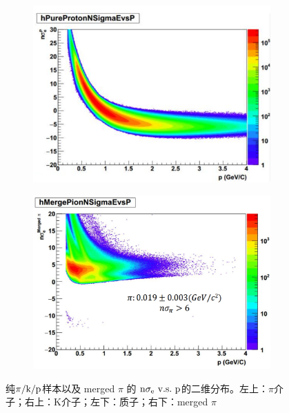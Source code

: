 \begin{figure}[h!]
    \begin{subfigure}[h!]{0.43\textwidth}
            \includegraphics[width=\textwidth]{figures/Chapter4/PureProton.png}
            \caption{}
            \label{fig:PureProton}
    \end{subfigure}
    \begin{subfigure}[h!]{0.43\textwidth}
            \includegraphics[width=\textwidth]{figures/Chapter4/PureMergePion.png}
            \caption{}
            \label{fig:PureMergePion}
    \end{subfigure}
    \caption[纯$\rm{\pi/k/p}$样本以及 merged $\pi$ 样本的$\rm{n\sigma_{e}~v.s.~p}$的二维分布]{纯$\rm{\pi/k/p}$样本以及 merged $\pi$ 的  $\rm{n\sigma_{e}~v.s.~p}$的二维分布。左上：$\pi$介子；右上：K介子；左下：质子；右下：merged $\pi$ }
    \label{fig:pure_hadron_sample}
\end{figure}

